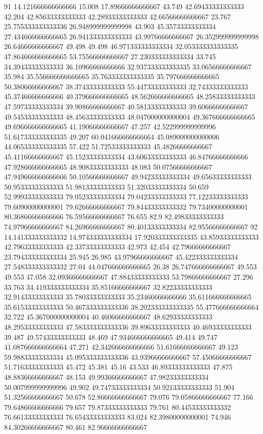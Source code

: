 91 14.121666666666666 15.008 17.89666666666667 43.749 42.69433333333333 42.204 42.85633333333333 42.28933333333333 42.66566666666667 23.767 25.755333333333336 26.948999999999998 43.903 45.35733333333334 27.434666666666665 26.941333333333333 43.99766666666667 26.352999999999998 26.64666666666667 49.498 49.498 46.971333333333334 32.053333333333335 47.864666666666665 53.75566666666667 27.230333333333334 33.745 34.39433333333333 36.10966666666666 32.937333333333335 33.06566666666667 35.984 35.556666666666665 35.763333333333335 35.797666666666665 50.38066666666667 38.37433333333333 55.44733333333333 32.74333333333333 45.37466666666666 40.379666666666665 48.562666666666665 48.25833333333333 47.59733333333334 39.90866666666667 40.58133333333333 39.60666666666667 49.54533333333333 48.45633333333333 48.047000000000004 49.367666666666665 49.696666666666665 41.19066666666667 47.257 42.522999999999996 51.617333333333335 49.207 60.041666666666664 45.089000000000006 44.065333333333335 57.422 51.72533333333333 45.48266666666667 45.41166666666667 45.15233333333334 43.60633333333333 46.84766666666666 47.928666666666665 48.90833333333333 48.083 50.07566666666667 47.949666666666666 50.10566666666667 49.94233333333334 49.65633333333333 50.95333333333333 51.98133333333333 51.32033333333334 50.659 52.99933333333333 79.05233333333334 79.04233333333333 77.12233333333333 79.60900000000001 79.62666666666667 79.84433333333332 79.73400000000001 80.36866666666666 76.59566666666667 76.655 82.9 82.49833333333333 74.97966666666667 84.26966666666667 80.40133333333334 82.95566666666667
92 14.141333333333332 14.974333333333334 17.920333333333335 43.85933333333333 42.79633333333333 42.33733333333333 42.973 42.454 42.79666666666667 23.794333333333334 25.945 26.985 43.97966666666667 45.422333333333334 27.548333333333332 27.04 44.047666666666665 26.38 26.747666666666667 49.553 49.553 47.058 32.09366666666667 47.88433333333333 53.79866666666667 27.296 33.763 34.419333333333334 35.85166666666667 32.82233333333333 32.91433333333333 35.78033333333333 35.23466666666666 35.611666666666665 35.61533333333333 50.467333333333336 38.202333333333335 55.477666666666664 32.722 45.367000000000004 40.46066666666667 48.62933333333333 48.29533333333333 47.583333333333336 39.89633333333333 40.46933333333333 39.487 49.57433333333333 48.469 47.934666666666665 49.414 49.747 41.087666666666664 47.271 42.342666666666666 51.61666666666667 49.123 59.98833333333334 45.095333333333336 43.93966666666667 57.45066666666667 51.71633333333333 45.472 45.381 45.16 43.533 46.89333333333333 47.875 48.88366666666667 48.153 49.99366666666667 47.98233333333334 50.007999999999996 49.902 49.74733333333334 50.92133333333333 51.904 51.32566666666667 50.678 52.86666666666667 79.076 79.05866666666667 77.166 79.64866666666666 79.657 79.87333333333333 79.761 80.44533333333332 76.66133333333333 76.65433333333333 83.024 82.39800000000001 74.946 84.30266666666667 80.461 82.96666666666667
